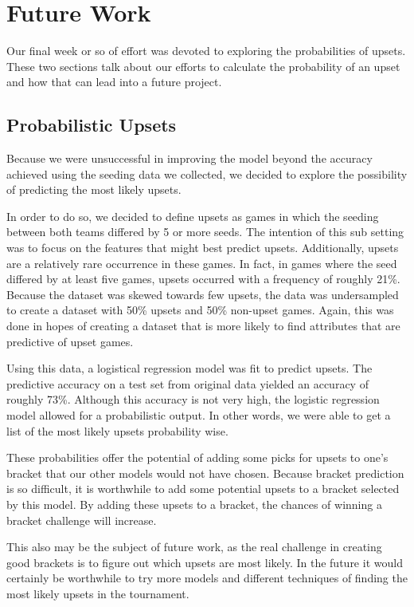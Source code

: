 \section{Future Work}
Our final week or so of effort was devoted to exploring the probabilities of upsets. 
These two sections talk about our efforts to calculate the probability of an upset and how that can lead into a future project.

\subsection{Probabilistic Upsets}
Because we were unsuccessful in improving the model beyond the accuracy achieved using the seeding data we collected, we decided to explore the possibility of predicting the most likely upsets. 

In order to do so, we decided to define upsets as games in which the seeding between both teams differed by 5 or more seeds. 
The intention of this sub setting was to focus on the features that might best predict upsets. 
Additionally, upsets are a relatively rare occurrence in these games. 
In fact, in games where the seed differed by at least five games, upsets occurred with a frequency of roughly 21\%.
Because the dataset was skewed towards few upsets, the data was undersampled to create a dataset with 50\% upsets and 50\% non-upset games. 
Again, this was done in hopes of creating a dataset that is more likely to find attributes that are predictive of upset games. 

Using this data, a logistical regression model was fit to predict upsets. 
The predictive accuracy on a test set from original data yielded an accuracy of roughly 73\%. 
Although this accuracy is not very high, the logistic regression model allowed for a probabilistic output. 
In other words, we were able to get a list of the most likely upsets probability wise. 

These probabilities offer the potential of adding some picks for upsets to one’s bracket that our other models would not have chosen. 
Because bracket prediction is so difficult, it is worthwhile to add some potential upsets to a bracket selected by this model. 
By adding these upsets to a bracket, the chances of winning a bracket challenge will increase. 

This also may be the subject of future work, as the real challenge in creating good brackets is to figure out which upsets are most likely. 
In the future it would certainly be worthwhile to try more models and different techniques of finding the most likely upsets in the tournament.

